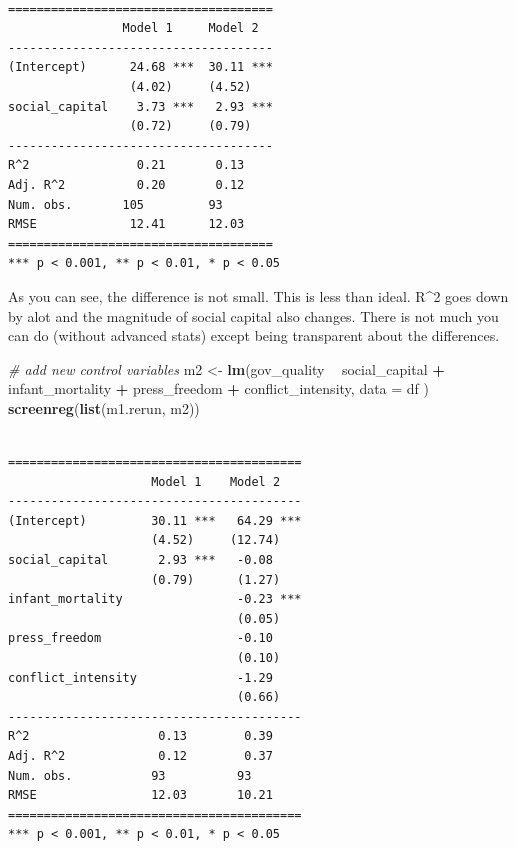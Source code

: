 \documentclass[]{article}
\newenvironment{Shaded}{\begin{snugshade}}{\end{snugshade}}
\newcommand{\KeywordTok}[1]{\textcolor[rgb]{0.13,0.29,0.53}{\textbf{#1}}}
\newcommand{\DataTypeTok}[1]{\textcolor[rgb]{0.13,0.29,0.53}{#1}}
\newcommand{\StringTok}[1]{\textcolor[rgb]{0.31,0.60,0.02}{#1}}
\newcommand{\CommentTok}[1]{\textcolor[rgb]{0.56,0.35,0.01}{\textit{#1}}}
\newcommand{\OperatorTok}[1]{\textcolor[rgb]{0.81,0.36,0.00}{\textbf{#1}}}
\newcommand{\NormalTok}[1]{#1}
\theoremstyle{definition}
\theoremstyle{definition}
\theoremstyle{definition}
\theoremstyle{remark}
\begin{document}
\begin{verbatim}

=====================================
                Model 1     Model 2  
-------------------------------------
(Intercept)      24.68 ***  30.11 ***
                 (4.02)     (4.52)   
social_capital    3.73 ***   2.93 ***
                 (0.72)     (0.79)   
-------------------------------------
R^2               0.21       0.13    
Adj. R^2          0.20       0.12    
Num. obs.       105         93       
RMSE             12.41      12.03    
=====================================
*** p < 0.001, ** p < 0.01, * p < 0.05
\end{verbatim}

As you can see, the difference is not small. This is less than ideal.
R\^{}2 goes down by alot and the magnitude of social capital also
changes. There is not much you can do (without advanced stats) except
being transparent about the differences.

\begin{Shaded}
\begin{Highlighting}[]
\CommentTok{# add new control variables}
\NormalTok{m2 <-}\StringTok{ }\KeywordTok{lm}\NormalTok{(gov_quality }\OperatorTok{~}\StringTok{ }\NormalTok{social_capital }\OperatorTok{+}\StringTok{ }\NormalTok{infant_mortality }\OperatorTok{+}\StringTok{ }\NormalTok{press_freedom }\OperatorTok{+}\StringTok{ }\NormalTok{conflict_intensity, }\DataTypeTok{data =}\NormalTok{ df )}
\KeywordTok{screenreg}\NormalTok{(}\KeywordTok{list}\NormalTok{(m1.rerun, m2))}
\end{Highlighting}
\end{Shaded}

\begin{verbatim}

=========================================
                    Model 1    Model 2   
-----------------------------------------
(Intercept)         30.11 ***   64.29 ***
                    (4.52)     (12.74)   
social_capital       2.93 ***   -0.08    
                    (0.79)      (1.27)   
infant_mortality                -0.23 ***
                                (0.05)   
press_freedom                   -0.10    
                                (0.10)   
conflict_intensity              -1.29    
                                (0.66)   
-----------------------------------------
R^2                  0.13        0.39    
Adj. R^2             0.12        0.37    
Num. obs.           93          93       
RMSE                12.03       10.21    
=========================================
*** p < 0.001, ** p < 0.01, * p < 0.05
\end{verbatim}
\end{document}
